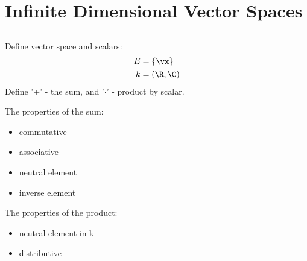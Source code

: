 \documentclass[cplx.tex]{subfiles}
\begin{document}
\part{Infinite Dimensional Vector Spaces}
\chapter{}
Define vector space and scalars:
\begin{align}
    E &= \{\vx\} \\
    k &= (\R, \C) 
\end{align}
Define '+' - the sum, and '$\cdot$' - product by scalar. 

\begin{multicols}{2}
    The properties of the sum:
    \begin{itemize}
        \item commutative
        \item associative
        \item neutral element
        \item inverse element
    \end{itemize}
    \columnbreak    
    The properties of the product:
    \begin{itemize}
        \item neutral element in k
        \item distributive
    \end{itemize}
\end{multicols}
\end{document}
